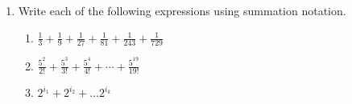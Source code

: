 \documentclass{article}
\begin{document}
\begin{enumerate}
                    \item Write each of the following expressions using summation notation.
                        \begin{enumerate}
                            \item $\displaystyle \frac{1}{3}+\frac{1}{9}+\frac{1}{27}+\frac{1}{81} + \frac{1}{243}+ \frac{1}{729}$
                            \item $\displaystyle \frac{5^2}{2!}+\frac{5^3}{3!}+\frac{5^4}{4!} + \cdots + \frac{5^{19}}{19!}$
                            \item $2^{i_1} + 2^{i_2} + \ldots 2^{i_k}$
                        \end{enumerate}
                \end{enumerate}
                
\end{document}
